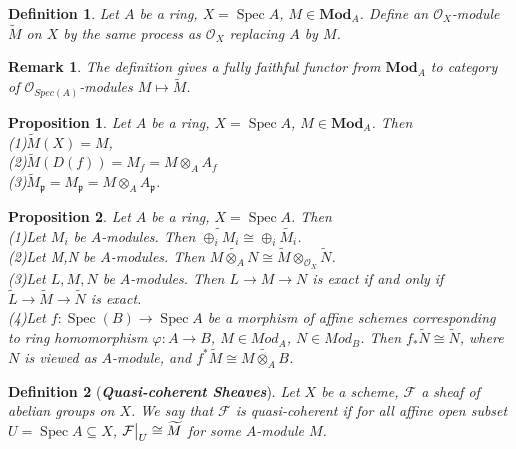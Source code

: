 \documentclass{ctexart}
\newtheorem{definition}{Definition}[section]
\newtheorem{remark}{Remark}[section]
\newtheorem{proposition}{Proposition}[section]
\newcommand{\spec}{\operatorname{Spec}}
\newcommand{\module}{\mathbf{Mod}}
\begin{document}
\begin{definition}
    Let $A$ be a ring, $X = \spec A$, $M\in \module_{A}$.
    Define an $\mathcal{O}_{X}$-module $\widetilde{M}$ on $X$ by the same process as $\mathcal{O}_{X}$ replacing $A$ by $M$.
\end{definition}
\begin{remark}
    The definition gives a fully faithful functor from $\module_{A}$ to category of $\mathcal{O}_{Spec(A)}$-modules $M \longmapsto \widetilde{M}$.
\end{remark}
\begin{proposition}
    Let $A$ be a ring, $X = \spec A$, $M\in \module_{A}$.
    Then \\
    (1)$\widetilde{M}(X) = M$, \\
    (2)$\widetilde{M}(D(f)) = M_{f} = M \otimes_{A} A_{f}$ \\
    (3)$\widetilde{M}_{\mathfrak{p}} = M_{\mathfrak{p}} = M \otimes_{A} A_{\mathfrak{p}}$.
    \label{Proposition 1.5}
\end{proposition}
\begin{proposition}
    Let $A$ be a ring, $X = \spec A$.
    Then \\
    (1)Let $M_{i}$ be $A$-modules. 
    Then $\widetilde{\oplus_{i} M_{i}} \cong \oplus_{i} \widetilde{M_{i}}$. \\
    (2)Let M,N be $A$-modules.
    Then $\widetilde{M \otimes_{A} N} \cong \widetilde{M} \otimes_{\mathcal{O}_{X}} \widetilde{N}$. \\
    (3)Let $L,M,N$ be $A$-modules.
    Then $L \longrightarrow M \longrightarrow N$ is exact if and only if $\widetilde{L} \longrightarrow \widetilde{M} \longrightarrow \widetilde{N}$ is exact. \\
    (4)Let $f: \spec(B) \longrightarrow \spec A$ be a morphism of affine schemes corresponding to ring homomorphism $\varphi: A \longrightarrow B$, $M\in Mod_{A}$, $N\in Mod_{B}$.
    Then $f_{\ast}\widetilde{N} \cong \widetilde{N}$, where $N$ is viewed as $A$-module, and $f^{\ast}\widetilde{M} \cong \widetilde{M \otimes_{A} B}$.
    \label{Proposition 1.6}
\end{proposition}
\begin{definition}[\textbf{\emph{Quasi-coherent Sheaves}}]
    Let $X$ be a scheme, $\mathcal{F}$ a sheaf of abelian groups on $X$.
    We say that $\mathcal{F}$ is quasi-coherent if for all affine open subset $U = \spec A \subseteq X$,
    $\mathcal{F}\big{|}_{U} \cong \widetilde{M}$ for some $A$-module $M$.
\end{definition}
\end{document}

